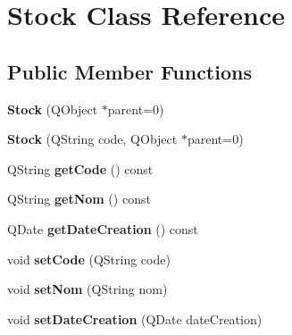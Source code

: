 \hypertarget{class_stock}{
\section{Stock Class Reference}
\label{class_stock}
}
\subsection*{Public Member Functions}
\begin{DoxyCompactItemize}
\item 
\hypertarget{class_stock_a1b90a96e24d0affdbefaa703d7ad0624}{
{\bfseries Stock} (QObject $\ast$parent=0)}
\label{class_stock_a1b90a96e24d0affdbefaa703d7ad0624}

\item 
\hypertarget{class_stock_a32eaf3588908b2bd834257eb8c3c0f5d}{
{\bfseries Stock} (QString code, QObject $\ast$parent=0)}
\label{class_stock_a32eaf3588908b2bd834257eb8c3c0f5d}

\item 
\hypertarget{class_stock_a262a945e9880b513402c8880123fbc66}{
QString {\bfseries getCode} () const }
\label{class_stock_a262a945e9880b513402c8880123fbc66}

\item 
\hypertarget{class_stock_ac68408396104dea13130cbaf737d6087}{
QString {\bfseries getNom} () const }
\label{class_stock_ac68408396104dea13130cbaf737d6087}

\item 
\hypertarget{class_stock_a01659734aa638a5317f7e2cd9fcb513d}{
QDate {\bfseries getDateCreation} () const }
\label{class_stock_a01659734aa638a5317f7e2cd9fcb513d}

\item 
\hypertarget{class_stock_a0d854244a0fd26661c311bd52489bd78}{
void {\bfseries setCode} (QString code)}
\label{class_stock_a0d854244a0fd26661c311bd52489bd78}

\item 
\hypertarget{class_stock_a9b1b0b47190cf10bb3b8aa114e92ac45}{
void {\bfseries setNom} (QString nom)}
\label{class_stock_a9b1b0b47190cf10bb3b8aa114e92ac45}

\item 
\hypertarget{class_stock_ab5e4f1471d9f4124cd4d4b7281592f88}{
void {\bfseries setDateCreation} (QDate dateCreation)}
\label{class_stock_ab5e4f1471d9f4124cd4d4b7281592f88}

\end{DoxyCompactItemize}
